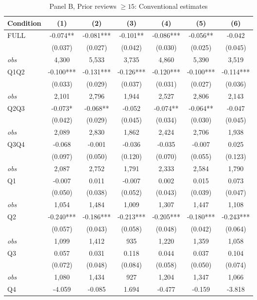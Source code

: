 \begin{table}[!htbp]
\centering
\caption{Panel B, Prior reviews $\geq 15$: Conventional estimates}
\label{tab:trim00:b:prior_reviews_ge15}
\small
\begin{tabular}{lcccccc}
\toprule
Condition & (1) & (2) & (3) & (4) & (5) & (6) \\
\midrule
FULL & -0.074** & -0.081*** & -0.101** & -0.086*** & -0.056** & -0.042 \\
 & (0.037) & (0.027) & (0.042) & (0.030) & (0.025) & (0.045) \\
\textit{obs} & 4,300 & 5,533 & 3,735 & 4,860 & 5,390 & 3,519 \\
Q1Q2 & -0.100*** & -0.131*** & -0.126*** & -0.120*** & -0.100*** & -0.114*** \\
 & (0.033) & (0.029) & (0.037) & (0.031) & (0.027) & (0.036) \\
\textit{obs} & 2,101 & 2,796 & 1,944 & 2,527 & 2,806 & 2,143 \\
Q2Q3 & -0.073* & -0.068** & -0.052 & -0.074** & -0.064** & -0.047 \\
 & (0.042) & (0.029) & (0.045) & (0.034) & (0.030) & (0.045) \\
\textit{obs} & 2,089 & 2,830 & 1,862 & 2,424 & 2,706 & 1,938 \\
Q3Q4 & -0.068 & -0.001 & -0.036 & -0.035 & -0.007 & 0.025 \\
 & (0.097) & (0.050) & (0.120) & (0.070) & (0.055) & (0.123) \\
\textit{obs} & 2,087 & 2,752 & 1,791 & 2,333 & 2,584 & 1,790 \\
Q1 & -0.007 & 0.011 & -0.007 & 0.002 & 0.015 & 0.073 \\
 & (0.050) & (0.038) & (0.052) & (0.043) & (0.039) & (0.047) \\
\textit{obs} & 1,054 & 1,484 & 1,009 & 1,307 & 1,447 & 1,108 \\
Q2 & -0.240*** & -0.186*** & -0.213*** & -0.205*** & -0.180*** & -0.243*** \\
 & (0.057) & (0.043) & (0.058) & (0.048) & (0.042) & (0.064) \\
\textit{obs} & 1,099 & 1,412 &   935 & 1,220 & 1,359 & 1,058 \\
Q3 & 0.057 & 0.031 & 0.118 & 0.044 & 0.037 & 0.104 \\
 & (0.072) & (0.048) & (0.084) & (0.058) & (0.050) & (0.074) \\
\textit{obs} & 1,080 & 1,434 &   927 & 1,204 & 1,347 & 1,066 \\
Q4 & -4.059 & -0.085 & 1.694 & -0.477 & -0.159 & -3.818 \\

\end{tabular}
\end{table}
